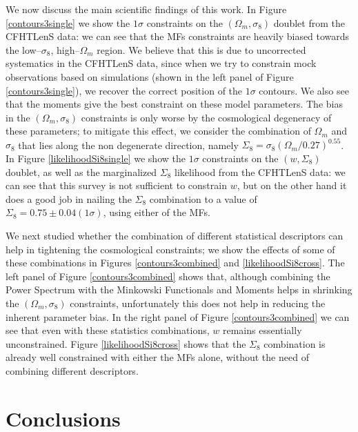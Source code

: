 \documentclass[reprint,aps,prd,superscriptaddress,showkeys,showpacs]{revtex4-1}
\begin{document}
We now discuss the main scientific findings of this work. In Figure \ref{contours3single} we show the $1\sigma$ constraints on the $(\Omega_m,\sigma_8)$ doublet from the CFHTLenS data: we can see that the MFs constraints are heavily biased towards the low--$\sigma_8$, high--$\Omega_m$ region. We believe that this is due to uncorrected systematics in the CFHTLenS data, since when we try to constrain mock observations based on simulations (shown in the left panel of Figure \ref{contours3single}), we recover the correct position of the $1\sigma$ contours. We also see that the moments give the best constraint on these model parameters. The bias in the $(\Omega_m,\sigma_8)$ constraints is only worse by the cosmological degeneracy of these parameters; to mitigate this effect, we consider the combination of $\Omega_m$ and $\sigma_8$ that lies along the non degenerate direction, namely $\Sigma_8=\sigma_8(\Omega_m/0.27)^{0.55}$. In Figure \ref{likelihoodSi8single} we show the $1\sigma$ constraints on the $(w,\Sigma_8)$ doublet, as well as the marginalized $\Sigma_8$ likelihood from the CFHTLenS data: we can see that this survey is not sufficient to constrain $w$, but on the other hand it does a good job in nailing the $\Sigma_8$ combination to a value of $\Sigma_8=0.75\pm0.04(1\sigma)$, using either of the MFs.

We next studied whether the combination of different statistical descriptors can help in tightening the cosmological constraints; we show the effects of some of these combinations in Figures \ref{contours3combined} and \ref{likelihoodSi8cross}. The left panel of Figure \ref{contours3combined} shows that, although combining the Power Spectrum with the Minkowski Functionals and Moments helps in shrinking the $(\Omega_m,\sigma_8)$ constraints, unfortunately this does not help in reducing the inherent parameter bias. In the right panel of Figure \ref{contours3combined} we can see that even with these statistics combinations, $w$ remains essentially unconstrained. Figure \ref{likelihoodSi8cross} shows that the $\Sigma_8$ combination is already well constrained with either the MFs alone, without the need of combining different descriptors.   

\newpage 

\section{Conclusions}
\end{document}
